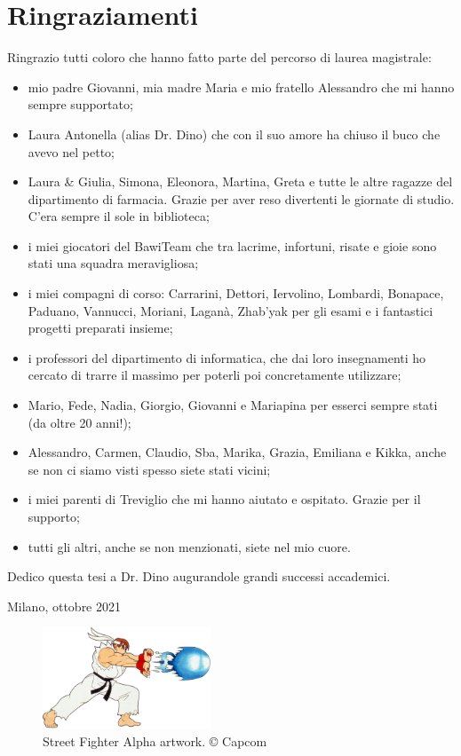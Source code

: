 %
%
\chapter*{Ringraziamenti}

Ringrazio tutti coloro che hanno fatto parte del percorso di laurea magistrale:
\begin{itemize}
	\item mio padre Giovanni, mia madre Maria e mio fratello Alessandro che mi hanno sempre supportato;
	\item Laura Antonella (alias Dr. Dino) che con il suo amore ha chiuso il buco che avevo nel petto;
	\item Laura \& Giulia, Simona, Eleonora, Martina, Greta e tutte le altre ragazze del dipartimento di farmacia. Grazie per aver reso divertenti le giornate di studio. C'era sempre il sole in biblioteca;
	\item i miei giocatori del BawiTeam che tra lacrime, infortuni, risate e gioie sono stati una squadra meravigliosa;
	\item i miei compagni di corso: Carrarini, Dettori, Iervolino, Lombardi, Bonapace, Paduano, Vannucci, Moriani, Laganà, Zhab'yak per gli esami e i fantastici progetti preparati insieme;
	\item i professori del dipartimento di informatica, che dai loro insegnamenti ho cercato di trarre il massimo per poterli poi concretamente utilizzare;
	\item Mario, Fede, Nadia, Giorgio, Giovanni e Mariapina per esserci sempre stati (da oltre 20 anni!);
	\item Alessandro, Carmen, Claudio, Sba, Marika, Grazia, Emiliana e Kikka, anche se non ci siamo visti spesso siete stati vicini;	
	\item i miei parenti di Treviglio che mi hanno aiutato e ospitato. Grazie per il supporto;
	\item tutti gli altri, anche se non menzionati, siete nel mio cuore.
\end{itemize}

Dedico questa tesi a Dr. Dino augurandole grandi successi accademici.

\begin{flushright}
	Milano, ottobre 2021
\end{flushright}

\vspace*{\fill}

\begin{figure}[H]
	\centering
	\includegraphics[width=5cm]{immagini/hadoken}
	\caption{Street Fighter Alpha artwork. © Capcom}
	\label{fig:hadoken}
\end{figure}